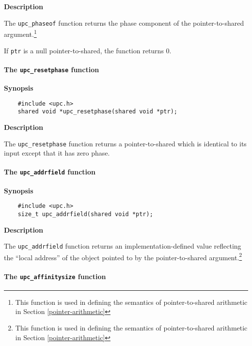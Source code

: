 {\bf Description}

\np The {\tt upc\_phaseof} function returns the phase component of the
    pointer-to-shared argument.\footnote{%
   This function is used in defining the semantics of pointer-to-shared
   arithmetic in Section \ref{pointer-arithmetic}}

    
\np If {\tt ptr} is a null pointer-to-shared, the function returns 0.

\paragraph{The {\tt upc\_resetphase} function}

{\bf Synopsis} 

\npf\vspace{-2.5em}
\begin{verbatim}
    #include <upc.h> 
    shared void *upc_resetphase(shared void *ptr); 
\end{verbatim}

{\bf Description}

\np The {\tt upc\_resetphase} function returns a pointer-to-shared
    which is identical to its input except that it has zero phase. 

\paragraph{The {\tt upc\_addrfield} function}
\label{upc_addrfield}

{\bf Synopsis} 

\npf\vspace{-2.5em}

\begin{verbatim}
    #include <upc.h> 
    size_t upc_addrfield(shared void *ptr); 
\end{verbatim}

{\bf Description}

\np The {\tt upc\_addrfield} function returns an
   implementation-defined value reflecting the ``local address'' of the
   object pointed to by the pointer-to-shared argument.\footnote{%
   This function is used in defining the semantics of pointer-to-shared
   arithmetic in Section \ref{pointer-arithmetic}}

   
\paragraph{The {\tt upc\_affinitysize} function}

